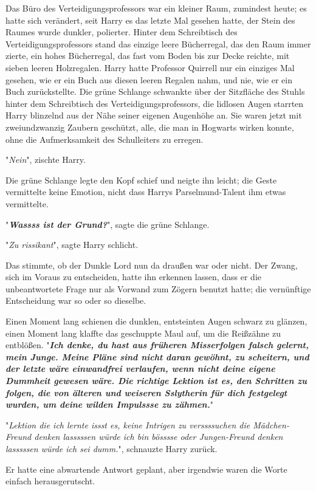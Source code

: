 {Das Büro des Verteidigungsprofessors war ein kleiner Raum, zumindest heute; es hatte sich verändert, seit Harry es das letzte Mal gesehen hatte, der Stein des Raumes wurde dunkler, polierter. Hinter dem Schreibtisch des Verteidigungsprofessors stand das einzige leere Bücherregal, das den Raum immer zierte, ein hohes Bücherregal, das fast vom Boden bis zur Decke reichte, mit sieben leeren Holzregalen. Harry hatte Professor Quirrell nur ein einziges Mal gesehen, wie er ein Buch aus diesen leeren Regalen nahm, und nie, wie er ein Buch zurückstellte. Die grüne Schlange schwankte über der Sitzfläche des Stuhls hinter dem Schreibtisch des Verteidigungsprofessors, die lidlosen Augen starrten Harry blinzelnd aus der Nähe seiner eigenen Augenhöhe an. Sie waren jetzt mit zweiundzwanzig Zaubern geschützt, alle, die man in Hogwarts wirken konnte, ohne die Aufmerksamkeit des Schulleiters zu erregen.

"\emph{Nein}", zischte Harry.

Die grüne Schlange legte den Kopf schief und neigte ihn leicht; die Geste vermittelte keine Emotion, nicht dass Harrys Parselmund-Talent ihm etwas vermittelte.

"\textbf{\emph{Wassss ist der Grund?}}", sagte die grüne Schlange.

"\emph{Zu rissikant}", sagte Harry schlicht.

Das stimmte, ob der Dunkle Lord nun da draußen war oder nicht. Der Zwang, sich im Voraus zu entscheiden, hatte ihn erkennen lassen, dass er die unbeantwortete Frage nur als Vorwand zum Zögern benutzt hatte; die vernünftige Entscheidung war so oder so dieselbe.

Einen Moment lang schienen die dunklen, entsteinten Augen schwarz zu glänzen, einen Moment lang klaffte das geschuppte Maul auf, um die Reißzähne zu entblößen. "\textbf{\emph{Ich denke, du hast aus früheren Misserfolgen falsch gelernt, mein Junge. Meine Pläne sind nicht daran gewöhnt, zu scheitern, und der letzte wäre einwandfrei verlaufen, wenn nicht deine eigene Dummheit gewesen wäre. Die richtige Lektion ist es, den Schritten zu folgen, die von älteren und weiseren Sslytherin für dich festgelegt wurden, um deine wilden Impulssse zu zähmen.}}"

"\emph{Lektion die ich lernte issst es, keine Intrigen zu verssssuchen die Mädchen-Freund denken lasssssen würde ich bin bösssse oder Jungen-Freund denken lasssssen würde ich sei dumm.}", schnauzte Harry zurück.

Er hatte eine abwartende Antwort geplant, aber irgendwie waren die Worte einfach herausgerutscht.

}
